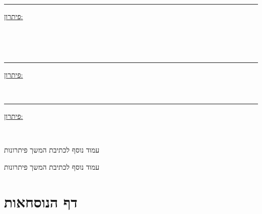 \documentclass[12pt, a4paper]{article}
\begin{document}
\begin{enumerate}
    \pagebreak

    
    \secondQ
    \noindent\rule{\textwidth-30pt}{0.4pt}
    \underline{פיתרון:}


    \pagebreak \ \pagebreak \ 

    \ 
    
    \pagebreak

    \thirdQ
    \noindent\rule{\textwidth-30pt}{0.4pt}
    \underline{פיתרון:}


    \pagebreak \ \pagebreak

    \forthQ
    \noindent\rule{\textwidth-30pt}{0.4pt}
    \underline{פיתרון:}


    \pagebreak \ \pagebreak
\end{enumerate}

    \pagebreak 
    
    עמוד נוסף לכתיבת המשך פיתרונות
    
    \pagebreak
    עמוד נוסף לכתיבת המשך פיתרונות

 \pagebreak


\section*{דף הנוסחאות}
\end{document}
